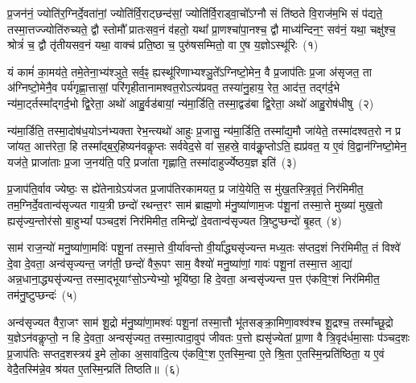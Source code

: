 \label{sec:startkanda7}
\setcounter{anuvakam}{0}
प्र॒जन॑नं॒ ज्योति॑र॒ग्निर्दे॒वता॑नां॒ ज्योति॑र्वि॒राट्छन्द॑सां॒ ज्योति॑र्वि॒राड्वा॒चो᳚\-ऽग्नौ सं ति॑ष्ठते वि॒राज॑म॒भि सं प॑द्यते॒ तस्मा॒\-त्तज्ज्योति॑रुच्यते॒ द्वौ स्तोमौ᳚ प्रातःसव॒नं व॑हतो॒ यथा᳚ प्रा॒णश्चा॑पा॒नश्च॒ द्वौ माध्य॑न्दिन॒ꣳ॒ सव॑नं॒ यथा॒ चक्षु॑श्च॒ श्रोत्रं॑ च॒ द्वौ तृ॑तीय\-सव॒नं यथा॒ वाक्च॑ प्रति॒ष्ठा च॒ पुरु॑षसम्मितो॒ वा ए॒ष य॒ज्ञो\-ऽस्थू॑रिः~(१)\ip

यं कामं॑ का॒मय॑ते॒ तमे॒तेना॒भ्य॑श्ञुते॒ सर्व॒ꣴ॒ ह्यस्थू॑रिणाभ्यश्ञु॒ते᳚\-ऽग्निष्टो॒मेन॒ वै प्र॒जा\-प॑तिः प्र॒जा अ॑सृजत॒ ता अ॑ग्निष्टो॒मेनै॒व पर्य॑गृह्णा॒त्तासां॒ परि॑गृहीतानामश्वत॒रो\-ऽत्य॑प्रवत॒ तस्या॑नु॒हाय॒ रेत॒ आद॑त्त॒ तद्ग॑र्द॒भे न्य॑मा॒र्ट्तस्मा᳚द्\-गर्द॒भो द्वि॒रेता॒ अथो॑ आहु॒र्वड॑बायां॒ न्य॑मा॒र्डिति॒ तस्मा॒द्वड॑बा द्वि॒रेता॒ अथो॑ आहु॒रोष॑धीषु~(२)\ip

न्य॑मा॒र्डिति॒ तस्मा॒दोष॑ध॒यो\-ऽन॑भ्यक्ता रेभ॒न्त्यथो॑ आहुः प्र॒जासु॒ न्य॑मा॒र्डिति॒ तस्मा᳚द्\-य॒मौ जा॑येते॒ तस्मा॑दश्वत॒रो न प्र जा॑यत॒ आत्त॑रेता॒ हि तस्मा᳚द्\-ब॒र्॒\mbox{}हिष्यन॑वकॢप्तः सर्ववेद॒से वा॑ स॒हस्रे॒ वाव॑कॢ॒प्तो\-ऽति॒ ह्यप्र॑वत॒ य ए॒वं वि॒द्वान॑ग्निष्टो॒मेन॒ यज॑ते॒ प्राजा॑ताः प्र॒जा ज॒नय॑ति॒ परि॒ प्रजा॑ता गृह्णाति॒ तस्मा॑दाहुर्ज्येष्ठय॒ज्ञ इति॑~(३)\ip

प्र॒जा\-प॑ति॒र्वाव ज्येष्ठः॒ स ह्ये॑तेनाग्रे\-ऽय॑जत प्र॒जा\-प॑तिरकामयत॒ प्र जा॑ये॒येति॒ स मु॑ख॒तस्त्रि॒वृतं॒ निर॑मिमीत॒ तम॒ग्नि\-र्दे॒वतान्व॑सृज्यत गाय॒त्री छन्दो॑ रथन्त॒रꣳ साम॑ ब्राह्म॒णो म॑नु॒ष्या॑णाम॒जः प॑शू॒नां तस्मा॒त्ते मुख्या॑ मुख॒तो ह्यसृ॑ज्य॒न्तोर॑सो बा॒हु\-भ्यां᳚ पञ्चद॒शं निर॑मिमीत॒ तमिन्द्रो॑ दे॒वतान्व॑सृज्यत त्रि॒ष्टुप्छन्दो॑ बृ॒हत्~(४)\ip

साम॑ राज॒न्यो॑ मनु॒ष्या॑णा॒मविः॑ पशू॒नां तस्मा॒त्ते वी॒र्या॑वन्तो वी॒र्या᳚द्ध्यसृ॑ज्यन्त मध्य॒तः स॑प्तद॒शं निर॑मिमीत॒ तं विश्वे॑ दे॒वा दे॒वता॒ अन्व॑सृज्यन्त॒ जग॑ती॒ छन्दो॑ वैरू॒पꣳ साम॒ वैश्यो॑ मनु॒ष्या॑णां॒ गावः॑ पशू॒नां तस्मा॒त्त आ॒द्या॑ अन्न॒धाना॒\-द्ध्यसृ॑ज्यन्त॒ तस्मा॒द्भूयाꣳ॑सो॒\-ऽन्येभ्यो॒ भूयि॑ष्ठा॒ हि दे॒वता॒ अन्वसृ॑ज्यन्त प॒त्त ए॑कवि॒ꣳ॒शं निर॑मिमीत॒ तम॑नु॒ष्टुप्छन्दः॑~(५)\ip

अन्व॑सृज्यत वैरा॒जꣳ साम॑ शू॒द्रो म॑नु॒ष्या॑णा॒मश्वः॑ पशू॒नां तस्मा॒त्तौ भू॑तसङ्क्रा॒मिणा॒वश्व॑श्च शू॒द्रश्च॒ तस्मा᳚च्छू॒द्रो य॒ज्ञे\-ऽन॑वकॢप्तो॒ न हि दे॒वता॒ अन्वसृ॑ज्यत॒ तस्मा॒त्पादा॒वुप॑ जीवतः प॒त्तो ह्यसृ॑ज्येतां प्रा॒णा वै त्रि॒वृद॑र्धमा॒साः प॑ञ्चद॒शः प्र॒जा\-प॑तिः सप्तद॒शस्त्रय॑ इ॒मे लो॒का अ॒सावा॑दि॒त्य ए॑कवि॒ꣳ॒श ए॒तस्मि॒न्वा ए॒ते श्रि॒ता ए॒तस्मि॒न्प्रति॑ष्ठिता॒ य ए॒वं वेदै॒तस्मि॑न्ने॒व श्र॑यत ए॒तस्मि॒न्प्रति॑ तिष्ठति॥~(६)\ip

